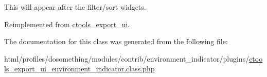 This will appear after the filter/sort widgets. 

Reimplemented from \hyperlink{classctools__export__ui_a08067ac459551d06772d81673801f023}{ctools\_\-export\_\-ui}.

The documentation for this class was generated from the following file:\begin{DoxyCompactItemize}
\item 
html/profiles/dosomething/modules/contrib/environment\_\-indicator/plugins/\hyperlink{ctools__export__ui__environment__indicator_8class_8php}{ctools\_\-export\_\-ui\_\-environment\_\-indicator.class.php}\end{DoxyCompactItemize}
